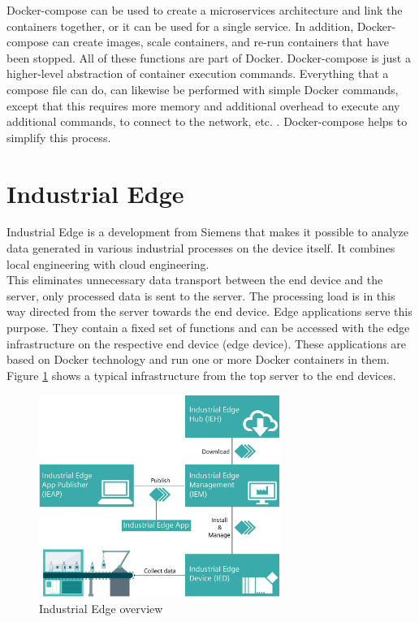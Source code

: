 		Docker-compose can be used to create a microservices architecture and link the containers together, or it can be used for a single service. In addition, Docker-compose can create images, scale containers, and re-run containers that have been stopped. All of these functions are part of Docker. Docker-compose is just a higher-level abstraction of container execution commands. Everything that a compose file can do, can likewise be performed with simple Docker commands, except that this requires more memory and additional overhead to execute any additional commands, to connect to the network, etc. . Docker-compose helps to simplify this process.\cite[P.~80]{Kinnary2018}
				
	\section{Industrial Edge}
	\label{Grundlagen:IndustrialEdge}
		
	Industrial Edge is a development from Siemens that makes it possible to analyze data generated in various industrial processes on the device itself. It combines local engineering with cloud engineering.\cite{siemensIndustrialEdge}\\

	This eliminates unnecessary data transport between the end device and the server, only processed data is sent to the server. The processing load is in this way directed from the server towards the end device. Edge applications serve this purpose. They contain a fixed set of functions and can be accessed with the edge infrastructure on the respective end device (edge device). These applications are based on Docker technology and run one or more Docker containers in them. Figure \ref{fig:Grundlagen:IndustrialEdge:Ueberblick} shows a typical infrastructure from the top server to the end devices.

		\begin{figure}[h]
			\centering
			\includegraphics[width=0.70\textwidth]{"Bilder/Edge_uebersicht.jpg"}
			\caption{Industrial Edge overview \cite{siemensIEM_gettingStarted}}
			\label{fig:Grundlagen:IndustrialEdge:Ueberblick}					
		\end{figure}
	
